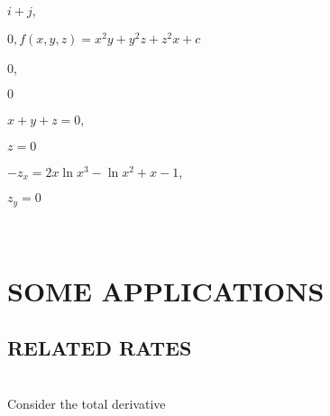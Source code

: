 \documentclass[11pt]{amsbook}
\begin{document}

\begin{hEnumerateArabic}

\item
  \begin{multicols}{2}
    \begin{hEnumerateAlpha}
      \item $i+j$,
      \item $0, f(x,y,z) = x^2y + y^2z + z^2x + c$
    \end{hEnumerateAlpha}
  \end{multicols}

\item
  \begin{multicols}{2}
    \begin{hEnumerateAlpha}
      \item $0$,
      \item $0$
    \end{hEnumerateAlpha}
  \end{multicols}

\item
  \begin{multicols}{2}
    \begin{hEnumerateAlpha}
      \item $x + y + z = 0$,
      \item $z = 0$
    \end{hEnumerateAlpha}
  \end{multicols}

\item
  \begin{multicols}{2}
    \begin{hEnumerateAlpha}
      \item $-z_x = 2x\ln x^3 - \ln x^2 + x - 1$,
      \item $z_y = 0$
    \end{hEnumerateAlpha}
  \end{multicols}

\end{hEnumerateArabic}

\ \\
\section{SOME APPLICATIONS}
\subsection{RELATED RATES}
\ \\
\indent Consider the total derivative
\end{document}

